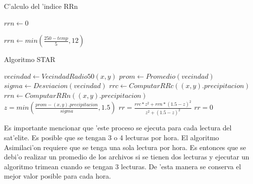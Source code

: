   \begin{algorithm}
  \caption{C'alculo del 'indice RRn}

  \begin{algorithmic}
	  \STATE $rrn \gets 0$
  \ELSE
	  
	  \STATE $rrn \gets min(\frac{250-temp}{5}, 12)$ 
	  
  \ENDIF 
  \end{algorithmic}
  \end{algorithm}

  \begin{algorithm}
  \caption{Algoritmo STAR}

  \begin{algorithmic}
      \STATE $vecindad \gets VecindadRadio50(x,y)$
      \STATE $prom \gets Promedio(vecindad)$
      \STATE $sigma \gets Desviacion(vecindad)$  
      \STATE $rrc \gets ComputarRRc((x,y).precipitacion)$
      \STATE $rrn \gets ComputarRRn((x,y).precipitacion)$
      \STATE $z = min(\frac{prom-(x,y).precipitacion}{sigma}, 1.5)$
	\STATE $rr = \frac{rrc*z^2 + rrn*(1.5-z)^2}{z^2+ (1.5-z)^2}$
      \ELSE	  
	\STATE $rr = 0$   
      \ENDIF
    \ENDFOR
  \end{algorithmic}
  \end{algorithm}

Es importante mencionar que 'este proceso se ejecuta para cada lectura del sat'elite. Es posible que se tengan 3 o 4 lecturas por hora. El algoritmo 
Asimilaci'on requiere que se tenga una sola lectura por hora. Es entonces que se debi'o realizar un promedio de los archivos si se tienen dos lecturas y 
ejecutar un algoritmo trimean cuando se tengan 3 lecturas. De 'esta manera se conserva el mejor valor posible para cada hora.

